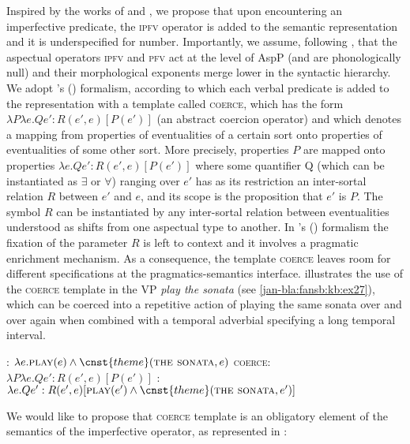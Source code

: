 \documentclass[output=paper]{langscibook}
\begin{document}
Inspired by the works of \citet{Dolling2014} and \citet{Egg2005}, we propose that upon encountering an imperfective predicate, the \textsc{ipfv} operator is added to the semantic representation and it is underspecified for number. Importantly, we assume, following \citet{Tatevosov2011, Tatevosov2015}, that the aspectual operators \textsc{ipfv} and \textsc{pfv} act at the level of AspP (and are phonologically null) and their morphological exponents merge lower in the syntactic hierarchy. We adopt \citeauthor{Dolling2014}'s (\citeyear[34--35]{Dolling2014}) formalism, according to which each verbal predicate is added to the representation with a template called \textsc{coerce}, which has the form $\lambda P \lambda e. Qe'\!:\!R(e', e) [P(e')]$ (an abstract coercion operator) and which denotes a mapping from properties of eventualities of a certain sort onto properties of eventualities of some other sort. More precisely, properties $P$ are mapped onto properties $\lambda e. Qe'\!:\!R(e', e) [P(e')]$ where some quantifier Q (which can be instantiated as $\exists$ or $\forall$) ranging over $e'$ has as its restriction an inter-sortal relation $R$ between $e'$ and $e$, and its scope is the proposition that $e'$ is $P$. The symbol $R$ can be instantiated by any inter-sortal relation between eventualities understood as shifts from one aspectual type to another. In \citeauthor{Dolling2014}'s (\citeyear[34--35]{Dolling2014}) formalism the fixation of the parameter $R$ is left to context and it involves a pragmatic enrichment mechanism. As a consequence, the template \textsc{coerce} leaves room for different specifications at the pragmatics-semantics interface. \citet[34--35]{Dolling2014} illustrates the use of the \textsc{coerce} template in the VP \textit{play the sonata} (see \ref{jan-bla:fansb:kb:ex27}), which can be coerced into a repetitive action of playing the same sonata over and over again when combined with a temporal adverbial specifying a long temporal interval.

\ea {}: $\lambda e. \textsc{play}(e) \wedge \cnst{theme}(\textsc{the sonata}, e)$\label{jan-bla:fansb:kb:ex27}
\ex \textsc{coerce}: 
$\lambda P \lambda e.Qe': R(e', e) [P(e')]$\label{jan-bla:fansb:kb:ex28}
\ex {}: $\lambda e.Qe': R(e',e) [\textsc{play}(e') \wedge \cnst{theme}(\textsc{the sonata}, e')]$\label{jan-bla:fansb:kb:ex29}
\z

\noindent We would like to propose that  \textsc{coerce} template is an obligatory element of the semantics of the imperfective operator, as represented in :
\end{document}
